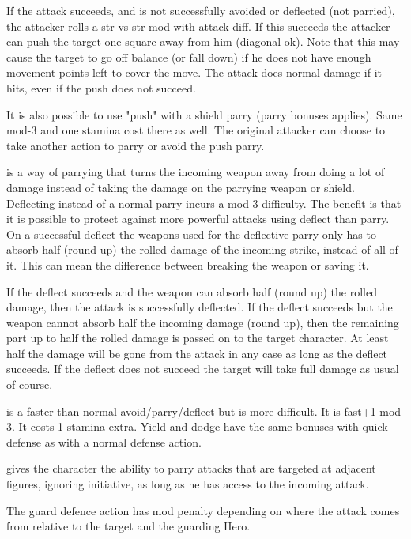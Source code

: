 If the attack succeeds, and is not successfully avoided or deflected (not parried), the attacker rolls a str vs str mod with attack diff. If this succeeds the attacker can push the target one square away from him (diagonal ok). Note that this may cause the target to go off balance (or fall down) if he does not have enough movement points left to cover the move. The attack does normal damage if it hits, even if the push does not succeed.

It is also possible to use "push" with a shield parry (parry bonuses applies). Same mod-3 and one stamina cost there as well. The original attacker can choose to take another action to parry or avoid the push parry.


 is a way of parrying that turns the incoming weapon away from doing a lot of damage instead of taking the damage on the parrying weapon or shield. Deflecting instead of a normal parry incurs a mod-3 difficulty. The benefit is that it is possible to protect against more powerful attacks using deflect than parry. On a successful deflect the weapons used for the deflective parry only has to absorb half (round up) the rolled damage of the incoming strike, instead of all of it. This can mean the difference between breaking the weapon or saving it.

If the deflect succeeds and the weapon can absorb half (round up) the rolled damage, then the attack is successfully deflected. If the deflect succeeds but the weapon cannot absorb half the incoming damage (round up), then the remaining part up to half the rolled damage is passed on to the target character. At least half the damage will be gone from the attack in any case as long as the deflect succeeds. If the deflect does not succeed the target will take full damage as usual of course.


 is a faster than normal avoid/parry/deflect but is more difficult. It is fast+1 mod-3. It costs 1 stamina extra.
Yield and dodge have the same bonuses with quick defense as with a normal defense action.


 gives the character the ability to parry attacks that are targeted at adjacent figures, ignoring initiative, as long as he has access to the incoming attack.

The guard defence action has mod penalty depending on where the attack comes from relative to the target and the guarding Hero.

